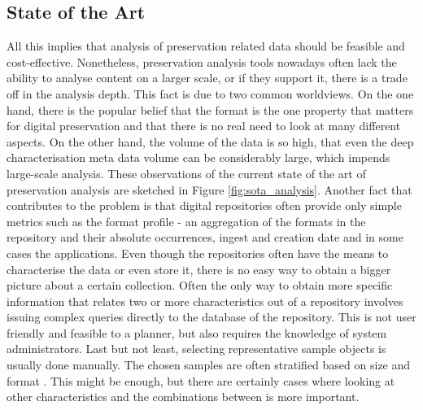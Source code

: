 \subsection{State of the Art}
All this implies that analysis of preservation related data should be feasible and cost-effective. Nonetheless, preservation analysis tools nowadays often lack the ability to analyse content on a larger scale, or if they support it, there is a trade off in the analysis depth. This fact is due to two common worldviews. On the one hand, there is the popular belief that the format is the one property that matters for digital preservation \cite{citeulike:8904907} and that there is no real need to look at many different aspects. On the other hand, the volume of the data is so high, that even the deep characterisation meta data volume can be considerably large, which impends large-scale analysis. These observations of the current state of the art of preservation analysis are sketched in Figure \ref{fig:sota_analysis}.
\newline\indent Another fact that contributes to the problem is that digital repositories often provide only simple metrics such as the format profile - an aggregation of the formats in the repository and their absolute occurrences, ingest and creation date and in some cases the applications. Even though the repositories often have the means to characterise the data or even store it, there is no easy way to obtain a bigger picture about a certain collection.
Often the only way to obtain more specific information that relates two or more characteristics out of a repository involves
issuing complex queries directly to the database of the repository. This is not user friendly and feasible to a planner, but also requires the knowledge of system administrators.
\newline\indent Last but not least, selecting representative sample objects is usually done manually. The chosen samples are often stratified based on size and format \cite{journals/dlib/KulovitsRKBBS09}. This might be enough, but there are certainly cases where looking at other characteristics and the combinations between is more important.

